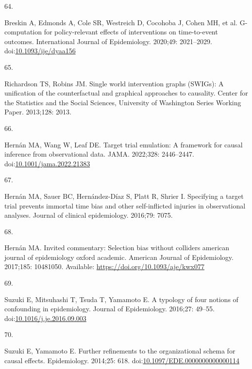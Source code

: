 \documentclass[
  singlecolumn]{article}
\newlength{\cslhangindent}
\newlength{\csllabelwidth}
\newlength{\cslentryspacingunit} %
\newenvironment{CSLReferences}[2] %
 {%
  \setlength{\parindent}{0pt}
  \ifodd #1
  \let\oldpar\par
  \def\par{\hangindent=\cslhangindent\oldpar}
  \fi
  \setlength{\parskip}{#2\cslentryspacingunit}
 }%
 {}
\newcommand{\CSLLeftMargin}[1]{\parbox[t]{\csllabelwidth}{#1}}
\newcommand{\CSLRightInline}[1]{\parbox[t]{\linewidth - \csllabelwidth}{#1}\break}
\begin{document}
\begin{CSLReferences}{0}{0}
\leavevmode{}%
\CSLLeftMargin{64. }%
\CSLRightInline{Breskin A, Edmonds A, Cole SR, Westreich D, Cocohoba J,
Cohen MH, et al. G-computation for policy-relevant effects of
interventions on time-to-event outcomes. International Journal of
Epidemiology. 2020;49: 2021--2029.
doi:\href{https://doi.org/10.1093/ije/dyaa156}{10.1093/ije/dyaa156}}

\leavevmode{}%
\CSLLeftMargin{65. }%
\CSLRightInline{Richardson TS, Robins JM. Single world intervention
graphs (SWIGs): A unification of the counterfactual and graphical
approaches to causality. Center for the Statistics and the Social
Sciences, University of Washington Series Working Paper. 2013;128: 2013.
}

\leavevmode{}%
\CSLLeftMargin{66. }%
\CSLRightInline{Hernán MA, Wang W, Leaf DE. Target trial emulation: A
framework for causal inference from observational data. JAMA. 2022;328:
2446--2447.
doi:\href{https://doi.org/10.1001/jama.2022.21383}{10.1001/jama.2022.21383}}

\leavevmode{}%
\CSLLeftMargin{67. }%
\CSLRightInline{Hernán MA, Sauer BC, Hernández-Díaz S, Platt R, Shrier
I. Specifying a target trial prevents immortal time bias and other
self-inflicted injuries in observational analyses. Journal of clinical
epidemiology. 2016;79: 7075. }

\leavevmode{}%
\CSLLeftMargin{68. }%
\CSLRightInline{Hernán MA. Invited commentary: Selection bias without
colliders \textbar{} american journal of epidemiology \textbar{} oxford
academic. American Journal of Epidemiology. 2017;185: 10481050.
Available: \url{https://doi.org/10.1093/aje/kwx077}}

\leavevmode{}%
\CSLLeftMargin{69. }%
\CSLRightInline{Suzuki E, Mitsuhashi T, Tsuda T, Yamamoto E. A typology
of four notions of confounding in epidemiology. Journal of Epidemiology.
2016;27: 49--55.
doi:\href{https://doi.org/10.1016/j.je.2016.09.003}{10.1016/j.je.2016.09.003}}

\leavevmode{}%
\CSLLeftMargin{70. }%
\CSLRightInline{Suzuki E, Yamamoto E. Further refinements to the
organizational schema for causal effects. Epidemiology. 2014;25: 618.
doi:\href{https://doi.org/10.1097/EDE.0000000000000114}{10.1097/EDE.0000000000000114}}


\end{CSLReferences}
\end{document}
